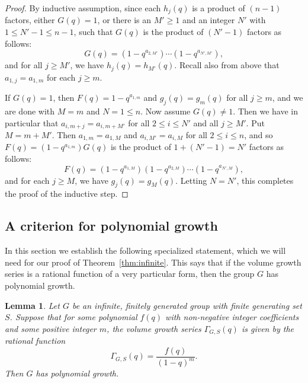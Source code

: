 \documentclass[11pt]{amsart}
\theoremstyle{plain}
\newtheorem{lemma}[thm]{Lemma}
\theoremstyle{definition}
\newcommand{\G}{\Gamma} %
\numberwithin{equation}{subsection}
\begin{document}
\begin{proof}
	
	By inductive assumption, since each $h_j(q)$ is a product of $(n-1)$ factors, either $G(q) = 1$, or there is an $M' \geq 1$ and an integer $N'$ with $1 \leq N' -1 \leq n-1$, such that $G(q)$ is the product of $(N' - 1)$ factors as follows:
	\[
	G(q) 
	=
	(1 - q^{a_{2,M'}})
	\cdots
	(1 - q^{a_{N',M'}}),
	\]
	and for all $j \geq M'$, we have $h_j(q) = h_{M'}(q)$. Recall also from above that $a_{1,j} = a_{1,m}$ for each $j \geq m$. 
	
	If $G(q) = 1$, then $F(q) = 1 - q^{a_{1,m}}$ and $g_j(q) = g_m(q)$ for all $j \geq m$, and we are done with $M = m$ and $N = 1 \leq n$. Now assume $G(q) \neq 1$. Then we have in particular that $a_{i,m+j} = a_{i,m+M'}$ for all $2 \leq i \leq N'$ and all $j \geq M'$.  Put $M = m + M'$. Then $a_{1,m} = a_{1,M}$ and $a_{i,M'} = a_{i,M}$ for all $2 \leq i \leq n$, and so $F(q) = (1 - q^{a_{1,m}})G(q)$ is the product of $1 + (N'-1) = N'$ factors as follows:
	\[
	F(q)
	=
	(1-q^{a_{1,M}})
	(1 - q^{a_{2,M}})
	\cdots
	(1 - q^{a_{N',M}}),
	\]
	and for each $j \geq M$, we have $g_j(q) = g_M(q)$. Letting $N = N'$, this completes the proof of the inductive step.
\end{proof}


\subsection{A criterion for polynomial growth}\label{sec:PolynomialCriterion}

In this section we establish the following specialized statement, which we will need for our proof of Theorem~\ref{thm:infinite}. This says that if the volume growth series is a rational function of a very particular form, then the group $G$ has polynomial growth.

\begin{lemma}\label{lem:polyGrowth} Let $G$ be an infinite, finitely generated group with finite generating set $S$. Suppose that for some polynomial $f(q)$ with non-negative integer coefficients and some positive integer $m$, the volume growth series $\G_{G,S}(q)$ is given by the rational function
\[
\G_{G,S}(q) = \frac{f(q)}{(1-q)^m}.
\] Then $G$ has polynomial growth. 
\end{lemma}
\end{document}
